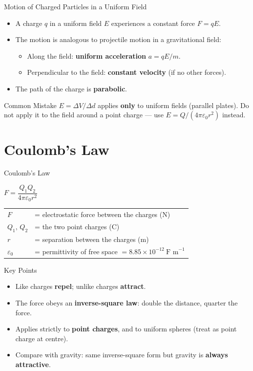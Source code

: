 \begin{keybox}{Motion of Charged Particles in a Uniform Field}
\begin{itemize}[itemsep=2pt]
  \item A charge $q$ in a uniform field $E$ experiences a constant force $F = qE$.
  \item The motion is analogous to projectile motion in a gravitational field:
    \begin{itemize}
      \item Along the field: \textbf{uniform acceleration} $a = qE/m$.
      \item Perpendicular to the field: \textbf{constant velocity} (if no other forces).
    \end{itemize}
  \item The path of the charge is \textbf{parabolic}.
\end{itemize}
\end{keybox}

\begin{warningbox}{Common Mistake}
$E = \Delta V / \Delta d$ applies \textbf{only} to uniform fields (parallel plates). Do not apply it to the field around a point charge — use $E = Q/(4\pi\varepsilon_0 r^2)$ instead.
\end{warningbox}

\section{Coulomb's Law}

\begin{formulabox}{Coulomb's Law}
\begin{center}
\Large $F = \dfrac{Q_1 Q_2}{4\pi\varepsilon_0 r^2}$
\end{center}
\vspace{0.3em}
\begin{tabular}{@{}ll@{}}
$F$ & = electrostatic force between the charges (N) \\
$Q_1,\,Q_2$ & = the two point charges (C) \\
$r$ & = separation between the charges (m) \\
$\varepsilon_0$ & = permittivity of free space $= 8.85\times10^{-12}\ \text{F m}^{-1}$ \\
\end{tabular}
\end{formulabox}

\begin{keybox}{Key Points}
\begin{itemize}[itemsep=2pt]
  \item Like charges \textbf{repel}; unlike charges \textbf{attract}.
  \item The force obeys an \textbf{inverse-square law}: double the distance, quarter the force.
  \item Applies strictly to \textbf{point charges}, and to uniform spheres (treat as point charge at centre).
  \item Compare with gravity: same inverse-square form but gravity is \textbf{always attractive}.
\end{itemize}
\end{keybox}

